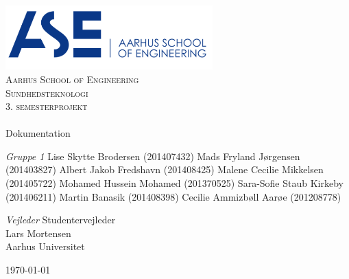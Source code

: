 \begin{titlingpage}
\begin{center}

~ \\[3cm]


\includegraphics[width=0.6\textwidth]{Figurer/ASE}\\[1cm]

\textsc{\LARGE Aarhus School of Engineering}\\[1.5cm]

\textsc{\Large Sundhedsteknologi}\\
\textsc{\Large 3. semesterprojekt}\\[0.5cm]

\noindent\makebox[\linewidth]{\rule{\textwidth}{0.4pt}}\\
[0.5cm]{\Huge Dokumentation}
\noindent\makebox[\linewidth]{\rule{\textwidth}{0.4pt}}

\end{center}

\textit{Gruppe 1} \newline
Lise Skytte Brodersen (201407432) \newline
Mads Fryland J\o rgensen (201403827) \newline
Albert Jakob Fredshavn (201408425) \newline
Malene Cecilie Mikkelsen (201405722) \newline		 
Mohamed Hussein Mohamed (201370525) \newline 
Sara-Sofie Staub Kirkeby (201406211) \newline
Martin Banasik (201408398) \newline
Cecilie Ammizb\o ll Aar\o e (201208778) \newline 


\textit{Vejleder} \newline
Studentervejleder\\
Lars Mortensen\\
Aarhus Universitet


\vfill

\begin{center}
{\large \today}
\end{center}


\end{titlingpage}